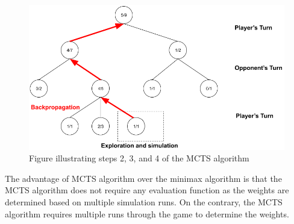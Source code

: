 \begin{figure}[!ht]
    \centering
    \includegraphics[width=\linewidth]{../img/MCTS2.png}
    \caption{Figure illustrating steps 2, 3, and 4 of the MCTS algorithm}
    \label{fig:MCTS2}
\end{figure}

The advantage of \ac{MCTS} algorithm over the minimax algorithm is that the \ac{MCTS} algorithm does not require any evaluation function as the weights are determined based on multiple simulation runs. On the contrary, the \ac{MCTS} algorithm requires multiple runs through the game to determine the weights.